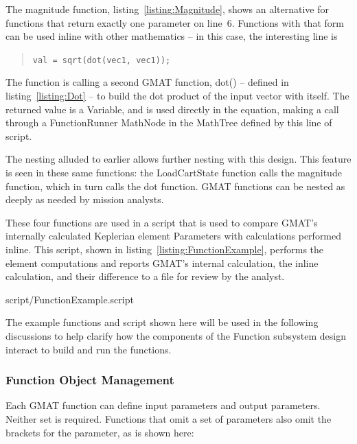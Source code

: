 The magnitude function, listing~\ref{listing:Magnitude}, shows an alternative for functions that
return exactly one parameter on line~6.  Functions with that form can be used inline with other
mathematics -- in this case, the interesting line is

\begin{quote}
\texttt{val = sqrt(dot(vec1, vec1));}
\end{quote}

\noindent The function is calling a second GMAT function, dot() -- defined in
listing~\ref{listing:Dot} -- to build the dot product of the input vector with itself.  The
returned value is a Variable, and is used directly in the equation, making a call through a
FunctionRunner MathNode in the MathTree defined by this line of script.

The nesting alluded to earlier allows further nesting with this design.  This feature is seen in
these same functions: the LoadCartState function calls the magnitude function, which in turn calls
the dot function.  GMAT functions can be nested as deeply as needed by mission analysts.

These four functions are used in a script that is used to compare GMAT's internally calculated
Keplerian element Parameters with calculations performed inline.  This script, shown in
listing~\ref{listing:FunctionExample}, performs the element computations and reports GMAT's
internal calculation, the inline calculation, and their difference to a file for review by the
analyst.

\lstset{numbers=left}

{script/FunctionExample.script}
\lstset{numbers=none}

The example functions and script shown here will be used in the following discussions to help
clarify how the components of the Function subsystem design interact to build and run the functions.



\subsubsection{Function Object Management}

Each GMAT function can define input parameters and output parameters.  Neither set is required. 
Functions that omit a set of parameters also omit the brackets for the parameter, as is shown here:

